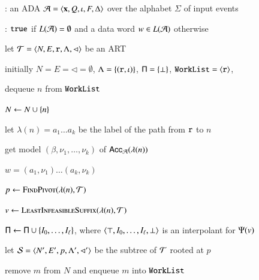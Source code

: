 \documentclass[10pt]{llncs}
\begin{document}
\begin{algorithm}[t!]
{\scriptsize\begin{algorithmic}[0]
: an ADA $\mathcal{A} = \left\langle \mathbf x,Q,\iota,F,\Delta \right\rangle$
over the alphabet $\Sigma$ of input events

: $\mathtt{true}$ if $L(\mathcal{A})=\emptyset$ and a data word $w
\in L(\mathcal{A})$ otherwise
\end{algorithmic}}

{\scriptsize\begin{algorithmic}[1] 

  \State let $\mathcal{T} = \left\langle N,E,\mathtt{r},\Lambda,\lhd \right\rangle$ be an ART

  \State initially $N = E = \lhd = \emptyset$, $\Lambda =
  \left\{ (\mathtt{r},\iota) \right\}$, $\mathsf{\Pi} = \left\{ \bot \right\}$, $\mathtt{WorkList} =
  \left\langle \mathtt{r} \right\rangle$,

  \While {$\worklist \neq \emptyset$}
  \label{ln:while}
  
  \State dequeue $n$ from $\mathtt{WorkList}$ 

  \State $N \leftarrow N \cup \left\{ n \right\}$

  \State let $\lambda(n) = a_1\ldots a_k$ be the label of the path from
  $\mathtt{r}$ to $n$ 

   

   
  \label{ln:feasible}

  \State get model $(\beta,\nu_1,\ldots,\nu_k)$ of
  $\mathsf{Acc}_{\mathcal{A}}(\lambda(n))$

   $w = (a_1,\nu_1) \ldots (a_k,\nu_k)$
  \label{ln:cex}

  \Else {}

  \State $p \leftarrow \Call{FindPivot}{\lambda(n),\Art}$
  \label{ln:pivot}

  \State $v \leftarrow \Call{LeastInfeasibleSuffix}{\lambda(n),\Art}$
  
  \State $\mathsf{\Pi} \leftarrow \mathsf{\Pi} \cup \left\{ I_0,\ldots,I_\ell \right\}$,
  where $\left\langle \top,I_0,\ldots,I_\ell,\bot \right\rangle$ is an interpolant for
  $\Psi(v)$

  \State let $\mathcal{S} = \left\langle N',E',p,\Lambda',\lhd' \right\rangle$ be the subtree
  of $\mathcal{T}$ rooted at $p$


  \State remove $m$ from $N$ and enqueue $m$ into $\mathtt{WorkList}$


\end{algorithmic}}
\end{algorithm}
\end{document}
